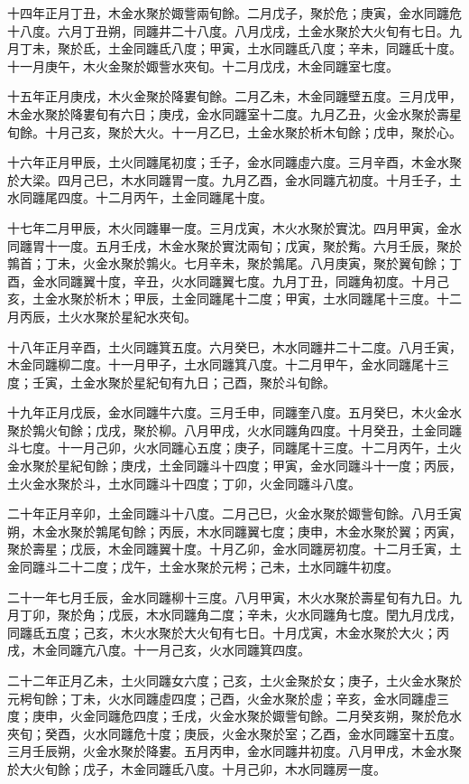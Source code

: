 \begin{pinyinscope}
十四年正月丁丑，木金水聚於娵訾兩旬餘。二月戊子，聚於危；庚寅，金水同躔危十八度。六月丁丑朔，同躔井二十八度。八月戊戌，土金水聚於大火旬有七日。九月丁未，聚於氐，土金同躔氐八度；甲寅，土水同躔氐八度；辛未，同躔氐十度。十一月庚午，木火金聚於娵訾水夾旬。十二月戊戌，木金同躔室七度。

十五年正月庚戌，木火金聚於降婁旬餘。二月乙未，木金同躔壁五度。三月戊甲，木金水聚於降婁旬有六日；庚戌，金水同躔室十二度。九月乙丑，火金水聚於壽星旬餘。十月己亥，聚於大火。十一月乙巳，土金水聚於析木旬餘；戊申，聚於心。

十六年正月甲辰，土火同躔尾初度；壬子，金水同躔虛六度。三月辛酉，木金水聚於大梁。四月己巳，木水同躔胃一度。九月乙酉，金水同躔亢初度。十月壬子，土水同躔尾四度。十二月丙午，土金同躔尾十度。

十七年二月甲辰，木火同躔畢一度。三月戊寅，木火水聚於實沈。四月甲寅，金水同躔胃十一度。五月壬戌，木金水聚於實沈兩旬；戊寅，聚於觜。六月壬辰，聚於鶉首；丁未，火金水聚於鶉火。七月辛未，聚於鶉尾。八月庚寅，聚於翼旬餘；丁酉，金水同躔翼十度，辛丑，火水同躔翼七度。九月丁丑，同躔角初度。十月己亥，土金水聚於析木；甲辰，土金同躔尾十二度；甲寅，土水同躔尾十三度。十二月丙辰，土火水聚於星紀水夾旬。

十八年正月辛酉，土火同躔箕五度。六月癸巳，木水同躔井二十二度。八月壬寅，木金同躔柳二度。十一月甲子，土水同躔箕八度。十二月甲午，金水同躔尾十三度；壬寅，土金水聚於星紀旬有九日；己酉，聚於斗旬餘。

十九年正月戊辰，金水同躔牛六度。三月壬申，同躔奎八度。五月癸巳，木火金水聚於鶉火旬餘；戊戌，聚於柳。八月甲戌，火水同躔角四度。十月癸丑，土金同躔斗七度。十一月己卯，火水同躔心五度；庚子，同躔尾十三度。十二月丙午，土火金水聚於星紀旬餘；庚戌，土金同躔斗十四度；甲寅，金水同躔斗十一度；丙辰，土火金水聚於斗，土水同躔斗十四度；丁卯，火金同躔斗八度。

二十年正月辛卯，土金同躔斗十八度。二月己巳，火金水聚於娵訾旬餘。八月壬寅朔，木金水聚於鶉尾旬餘；丙辰，木水同躔翼七度；庚申，木金水聚於翼；丙寅，聚於壽星；戊辰，木金同躔翼十度。十月乙卯，金水同躔房初度。十二月壬寅，土金同躔斗二十二度；戊午，土金水聚於元枵；己未，土水同躔牛初度。

二十一年七月壬辰，金水同躔柳十三度。八月甲寅，木火水聚於壽星旬有九日。九月丁卯，聚於角；戊辰，木水同躔角二度；辛未，火水同躔角七度。閏九月戊戌，同躔氐五度；己亥，木火水聚於大火旬有七日。十月戊寅，木金水聚於大火；丙戌，木金同躔亢八度。十一月己亥，火水同躔箕四度。

二十二年正月乙未，土火同躔女六度；己亥，土火金聚於女；庚子，土火金水聚於元枵旬餘；丁未，火水同躔虛四度；己酉，火金水聚於虛；辛亥，金水同躔虛三度；庚申，火金同躔危四度；壬戌，火金水聚於娵訾旬餘。二月癸亥朔，聚於危水夾旬；癸酉，火水同躔危十度；庚辰，火金水聚於室；乙酉，金水同躔室十五度。三月壬辰朔，火金水聚於降婁。五月丙申，金水同躔井初度。八月甲戌，木金水聚於大火旬餘；戊子，木金同躔氐八度。十月己卯，木水同躔房一度。


\end{pinyinscope}

